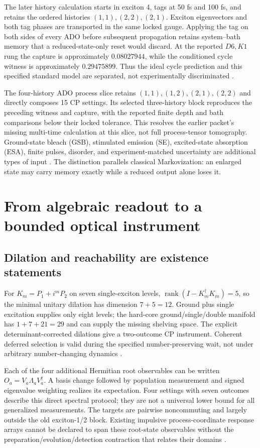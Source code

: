 \documentclass[11pt]{article}
\theoremstyle{definition}
\theoremstyle{remark}
\begin{document}
The later history calculation starts in exciton 4, tags at 50 fs and
100 fs, and retains the ordered histories \((1,1),(2,2),(2,1)\).
Exciton eigenvectors and both tag phases are transported in the same locked
gauge. Applying the tag on both sides of every ADO before subsequent
propagation retains system--bath memory that a reduced-state-only reset
would discard. At the reported \(D6,K1\) rung the capture is approximately
\(0.08027944\), while the conditioned cycle witness is approximately
\(0.29475899\). Thus the ideal cycle prediction and this specified standard
model are separated, not experimentally discriminated \cite{beq05}.

The four-history ADO process slice retains \((1,1),(1,2),(2,1),(2,2)\)
and directly composes 15 CP settings. Its selected three-history block
reproduces the preceding witness and capture, with the reported finite
depth and bath comparisons below their locked tolerance. This resolves the
earlier packet's missing multi-time calculation at this slice, not full
process-tensor tomography. Ground-state bleach (GSB), stimulated emission
(SE), excited-state absorption (ESA), finite pulses, disorder, and
experiment-matched uncertainty are additional types of input
\cite{beq06}. The distinction parallels classical Markovization: an enlarged
state may carry memory exactly while a reduced output alone loses it.

\section{From algebraic readout to a bounded optical instrument}
\label{sec:optical-readout}

\subsection{Dilation and reachability are existence statements}
\label{sec:optical-existence}
For \(K_m=P_1+i^mP_2\) on seven single-exciton levels,
\(\operatorname{rank}(I-K_m^\dagger K_m)=5\), so the minimal unitary
dilation has dimension \(7+5=12\). Ground plus single excitation supplies
only eight levels; the hard-core ground/single/double manifold has
\(1+7+21=29\) and can supply the missing shelving space. The explicit
determinant-corrected dilations give a two-outcome CP instrument. Coherent
deferred selection is valid during the specified number-preserving wait,
not under arbitrary number-changing dynamics \cite{beq07}.

Each of the four additional Hermitian root observables can be written
\(O_a=V_a\Lambda_aV_a^\dagger\). A basis change followed by population
measurement and signed eigenvalue weighting realizes its expectation.
Four settings with seven outcomes describe this direct spectral protocol;
they are not a universal lower bound for all generalized measurements.
The targets are pairwise noncommuting and largely outside the old
exciton-1/2 block. Existing impulsive process-coordinate response arrays
cannot be declared to span these root-state observables without the
preparation/evolution/detection contraction that relates their domains
\cite{beq08}.
\end{document}
